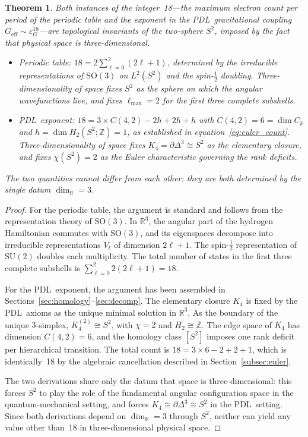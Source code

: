 \documentclass[11pt,a4paper]{article}
\newtheorem{theorem}{Theorem}[section]
\theoremstyle{definition}
\newcommand{\PDL}{\textnormal{PDL}}
\newcommand{\epsg}{\varepsilon_G}
\newcommand{\Kfour}{K_4}
\begin{document}
\begin{theorem}
  \label{thm:common_ancestor}
  Both instances of the integer~18---the maximum electron count per period of the periodic table and the exponent in the \PDL\ gravitational coupling $G_{\mathrm{eff}} \sim \epsg^{18}$---are topological invariants of the two-sphere $S^2$, imposed by the fact that physical space is three-dimensional.
  \begin{itemize}
    \item \emph{Periodic table:} $18 = 2\sum_{\ell=0}^{2}(2\ell+1)$, determined by the irreducible representations of $\mathrm{SO}(3)$ on $L^2(S^2)$ and the spin-$\tfrac{1}{2}$ doubling. Three-dimensionality of space fixes $S^2$ as the sphere on which the angular wavefunctions live, and fixes $\ell_{\max} = 2$ for the first three complete subshells.
    \item \emph{\PDL\ exponent:} $18 = 3 \times C(4,2) - 2h + 2h + h$ with $C(4,2) = 6 = \dim C_k$ and $h = \dim H_2(S^2;\mathbb{Z}) = 1$, as established in equation~\eqref{eq:euler_count}. Three-dimensionality of space fixes $\Kfour = \partial\Delta^3 \cong S^2$ as the elementary closure, and fixes $\chi(S^2) = 2$ as the Euler characteristic governing the rank deficits.
  \end{itemize}
  The two quantities cannot differ from each other: they are both determined by the single datum $\dim_{\mathbb{R}} = 3$.
\end{theorem}

\begin{proof}
For the periodic table, the argument is standard and follows from the representation theory of $\mathrm{SO}(3)$.\cite{Fulton_Harris_1991} In $\mathbb{R}^3$, the angular part of the hydrogen Hamiltonian commutes with $\mathrm{SO}(3)$, and its eigenspaces decompose into irreducible representations $V_\ell$ of dimension $2\ell+1$. The spin-$\tfrac{1}{2}$ representation of $\mathrm{SU}(2)$ doubles each multiplicity. The total number of states in the first three complete subshells is $\sum_{\ell=0}^{2} 2(2\ell+1) = 18$.

For the \PDL\ exponent, the argument has been assembled in Sections~\ref{sec:homology}--\ref{sec:decomp}. The elementary closure $\Kfour$ is fixed by the \PDL\ axioms as the unique minimal solution in $\mathbb{R}^3$. As the boundary of the unique $3$-simplex, $\Kfour^{(2)} \cong S^2$, with $\chi = 2$ and $H_2 \cong \mathbb{Z}$. The edge space of $\Kfour$ has dimension $C(4,2) = 6$, and the homology class $[S^2]$ imposes one rank deficit per hierarchical transition. The total count is $18 = 3 \times 6 - 2 + 2 + 1$, which is identically~18 by the algebraic cancellation described in Section~\ref{subsec:euler}.

The two derivations share only the datum that space is three-dimensional: this forces $S^2$ to play the role of the fundamental angular configuration space in the quantum-mechanical setting, and forces $\Kfour \cong \partial\Delta^3 \cong S^2$ in the \PDL\ setting. Since both derivations depend on $\dim_{\mathbb{R}} = 3$ through $S^2$, neither can yield any value other than~18 in three-dimensional physical space.
\end{proof}
\end{document}
